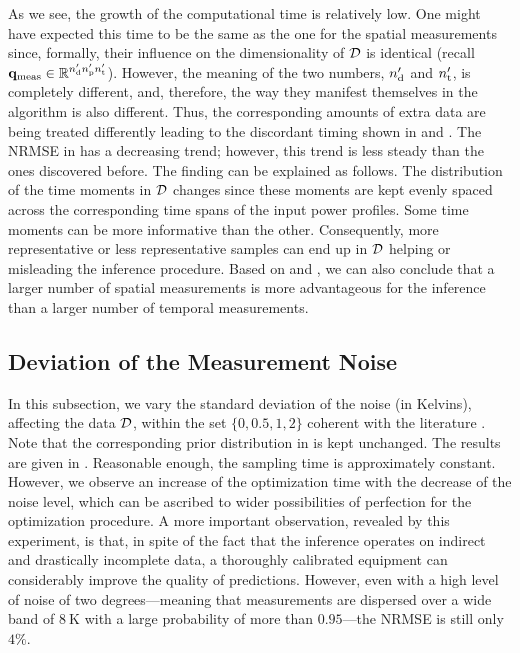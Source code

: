 As we see, the growth of the computational time is relatively low. One might have expected this time to be the same as the one for the spatial measurements since, formally, their influence on the dimensionality of $\mathcal{D}$ is identical (recall $\mathbf{q}_{\text{meas}} \in \mathbb{R}^{{n_\text{d}'} {n_\text{p}'} {n_\text{t}'}}$). However, the meaning of the two numbers, ${n_\text{d}'}$ and ${n_\text{t}'}$, is completely different, and, therefore, the way they manifest themselves in the algorithm is also different. Thus, the corresponding amounts of extra data are being treated differently leading to the discordant timing shown in  and .
The NRMSE in  has a decreasing trend; however, this trend is less steady than the ones discovered before. The finding can be explained as follows. The distribution of the time moments in $\mathcal{D}$ changes since these moments are kept evenly spaced across the corresponding time spans of the input power profiles. Some time moments can be more informative than the other. Consequently, more representative or less representative samples can end up in $\mathcal{D}$ helping or misleading the inference procedure.
Based on  and , we can also conclude that a larger number of spatial measurements is more advantageous for the inference than a larger number of temporal measurements.

\subsection{Deviation of the Measurement Noise}
In this subsection, we vary the standard deviation of the noise (in Kelvins), affecting the data $\mathcal{D}$, within the set $\{ 0, 0.5, 1, 2 \}$ coherent with the literature \cite{mesa-martinez2007}. Note that the corresponding prior distribution in  is kept unchanged. The results are given in .
Reasonable enough, the sampling time is approximately constant. However, we observe an increase of the optimization time with the decrease of the noise level, which can be ascribed to wider possibilities of perfection for the optimization procedure.
A more important observation, revealed by this experiment, is that, in spite of the fact that the inference operates on indirect and drastically incomplete data, a thoroughly calibrated equipment can considerably improve the quality of predictions.
However, even with a high level of noise of two degrees---meaning that measurements are dispersed over a wide band of $8~\text{K}$ with a large probability of more than $0.95$---the NRMSE is still only $4\%$.


